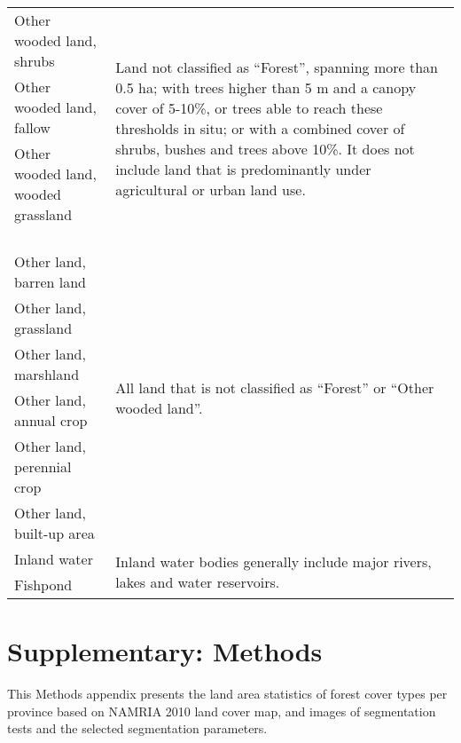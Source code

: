 \begin{appendices}
\begin{spacing}{1.0}
\begin{longtable}[h!]{ p{6cm} p{8cm} }
    \cmidrule{1-2}
    
    Other wooded land, shrubs & \multirow{7}{8cm}[0cm]{Land not classified as \enquote{Forest}, spanning more than 0.5 ha; with trees higher than 5 m and a canopy cover of 5-10\%, or trees able to reach these thresholds in situ; or with a combined cover of shrubs, bushes and trees above 10\%. It does not include land that is predominantly under agricultural or urban land use.}\\
    Other wooded land, fallow & {}\\
    Other wooded land, wooded grassland & {}\\
    {} & {}\\
    {} & {}\\
    {} & {}\\
    {} & {}\\[3pt]
    
    \cmidrule{1-2}
	
	Other land, barren land & \multirow{6}{8cm}[1cm]{All land that is not classified as \enquote{Forest} or \enquote{Other wooded land}.}\\
    Other land, grassland & {}\\
    Other land, marshland & {}\\
    Other land, annual crop & {}\\
    Other land, perennial crop & {}\\
    Other land, built-up area & {}\\[3pt]
    
    \cmidrule{1-2}
    
    Inland water & \multirow{2}{8cm}{Inland water bodies generally include major rivers, lakes and water reservoirs.}\\
    Fishpond & {}\\

	
    \bottomrule
\end{longtable}
\end{spacing}


\chapter{Supplementary: Methods}
\label{sup: supplementary-methods}

This Methods appendix presents the land area statistics of forest cover types per province based on NAMRIA 2010 land cover map, and images of segmentation tests and the selected segmentation parameters.



\end{appendices}
